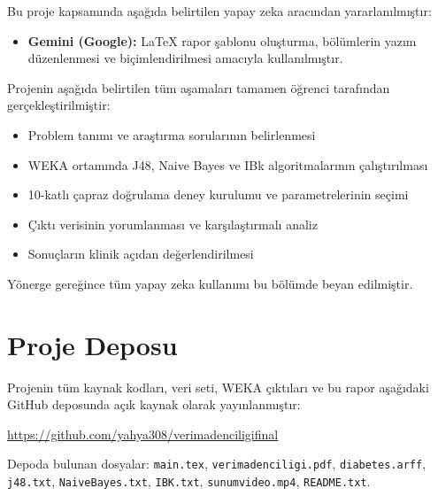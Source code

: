 \documentclass[12pt,a4paper]{article}
\begin{document}
Bu proje kapsamında aşağıda belirtilen yapay zeka aracından yararlanılmıştır:

\begin{itemize}
  \item \textbf{Gemini (Google):} LaTeX rapor şablonu oluşturma,
        bölümlerin yazım düzenlenmesi ve biçimlendirilmesi amacıyla kullanılmıştır.
\end{itemize}

Projenin aşağıda belirtilen tüm aşamaları tamamen öğrenci tarafından
gerçekleştirilmiştir:

\begin{itemize}
  \item Problem tanımı ve araştırma sorularının belirlenmesi
  \item WEKA ortamında J48, Naive Bayes ve IBk algoritmalarının çalıştırılması
  \item 10-katlı çapraz doğrulama deney kurulumu ve parametrelerinin seçimi
  \item Çıktı verisinin yorumlanması ve karşılaştırmalı analiz
  \item Sonuçların klinik açıdan değerlendirilmesi
\end{itemize}

Yönerge gereğince tüm yapay zeka kullanımı bu bölümde beyan edilmiştir.

\section*{Proje Deposu}

Projenin tüm kaynak kodları, veri seti, WEKA çıktıları ve bu rapor aşağıdaki
GitHub deposunda açık kaynak olarak yayınlanmıştır:

\begin{center}
  \url{https://github.com/yahya308/verimadenciligifinal}
\end{center}

Depoda bulunan dosyalar: \texttt{main.tex}, \texttt{verimadenciligi.pdf},
\texttt{diabetes.arff}, \texttt{j48.txt}, \texttt{NaiveBayes.txt},
\texttt{IBK.txt}, \texttt{sunumvideo.mp4}, \texttt{README.txt}.
\end{document}
